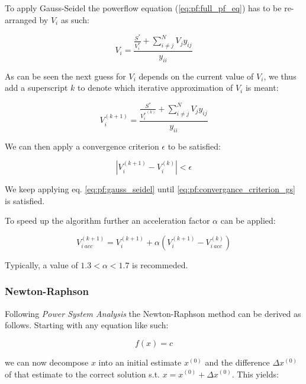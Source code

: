 To apply Gauss-Seidel the powerflow equation (\ref{eq:pf:full_pf_eq}) has to be re-arranged
by $V_i$ as such:

\begin{equation}
    V_i = \frac{\frac{S^*}{V_i^*} + \sum_{i \ne j}^N V_j y_{ij}}{y_{ii}}
\end{equation}

As can be seen the next guess for $V_i$ depends on the current value of $V_i$, we thus add a superscript $k$
to denote which iterative approximation of $V_i$ is meant:

\begin{equation}
    V_i^{(k+1)} = \frac{\frac{S^*}{{V_i^*}^{(k)}} + \sum_{i \ne j}^N V_j y_{ij}}{y_{ii}}
    \label{eq:pf:gauss_seidel}
\end{equation}

We can then apply a convergence criterion $\epsilon$ to be satisfied:

\begin{equation}
    |V_i^{(k+1)} - V_i^{(k)}| < \epsilon
    \label{eq:pf:convergance_criterion_gs}
\end{equation}

We keep applying eq. \ref{eq:pf:gauss_seidel} until \ref{eq:pf:convergance_criterion_gs}
is satisfied.

To speed up the algorithm further an acceleration factor $\alpha$ can be applied:

\begin{equation}
    V_{i \ acc}^{(k+1)} = V_i^{(k + 1)} + \alpha(V_i^{(k + 1)} - V_{i \ acc}^{(k)})
    \label{eq:pf:gs_pf}
\end{equation}

Typically, a value of $1.3 < \alpha < 1.7$ is recommeded\autocite{power_system_analysis}.

\subsubsection{Newton-Raphson}

Following \textit{Power System Analysis}\autocite{power_system_analysis} the Newton-Raphson method can be derived as follows. Starting with any equation like such:

\begin{equation}
    f(x) = c
    \label{eq:pf:nr_start_point}
\end{equation}

we can now decompose $x$ into an initial estimate $x^{(0)}$ 
and the difference $\Delta x^{(0)}$ of that estimate to the correct solution s.t.
$x = x^{(0)} + \Delta x^{(0)}$. This yields:

